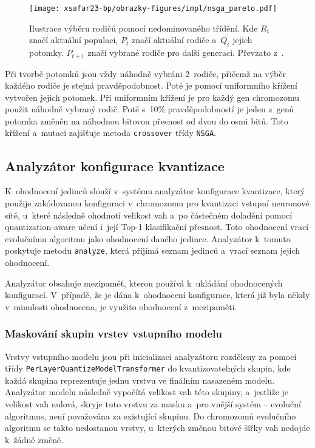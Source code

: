\begin{figure}[H]
	\centering
	\texttt{[image: xsafar23-bp/obrazky-figures/impl/nsga\_pareto.pdf]}
	\caption{Ilustrace výběru rodičů pomocí nedominovaného třídění. Kde $R_t$ značí aktuální populaci, $P_t$ značí aktuální rodiče a~$Q_t$ jejich potomky. $P_{t+1}$ značí vybrané rodiče pro další generaci. Převzato z~\cite{996017}. }
	\label{fig:nsga-parent-selection} 
\end{figure}

Při tvorbě potomků jsou vždy náhodně vybráni 2~rodiče, přičemž na výběr každého rodiče je stejná pravděpodobnost. Poté je pomocí uniformního křížení vytvořen jejich potomek. Při uniformním křížení je pro každý gen chromozomu použit náhodně vybraný rodič. Poté s~10\% pravděpodobností je jeden z~genů potomka změněn na náhodnou bitovou přesnost od dvou do osmi bitů. Toto křížení a~mutaci zajišťuje metoda \verb|crossover| třídy \verb|NSGA|.


\subsection{Analyzátor konfigurace kvantizace}

K~ohodnocení jedinců slouží v~systému analyzátor konfigurace kvantizace, který použije zakódovanou konfiguraci v~chromozomu pro kvantizaci vstupní neuronové sítě, u~které následně ohodnotí velikost vah a~po částečném doladění pomocí quantization-aware učení i~její Top-1 klasifikační přesnost. Toto ohodnocení vrací evolučnímu algoritmu jako ohodnocení daného jedince. Analyzátor k~tomuto poskytuje metodu \verb|analyze|, která přijímá seznam jedinců a~vrací seznam jejich ohodnocení.

Analyzátor obsahuje mezipaměť, kterou používá k~ukládání ohodnocených konfigurací. V~případě, že je dána k~ohodnocení konfigurace, která již byla někdy v~minulosti ohodnocena, je využito ohodnocení z~mezipaměti.

\subsubsection{Maskování skupin vrstev vstupního modelu}

Vrstvy vstupního modelu jsou při inicializaci analyzátoru rozděleny za pomocí třídy \texttt{PerLa\-yerQuantizeModelTransformer} do kvantizovatelných skupin, kde každá skupina reprezentuje jednu vrstvu ve finálním nasazeném modelu. Analyzátor modelu následně vypočítá velikost vah této skupiny, a~jestliže je velikost vah nulová, skryje tuto vrstvu za masku a~pro vnější systém -- evoluční algoritmus, není považována za existující skupinu. Do chromozomů evolučního algoritmu se takto nedostanou vrstvy, u~kterých změnou bitové šířky vah nedojde k~žádné změně.

